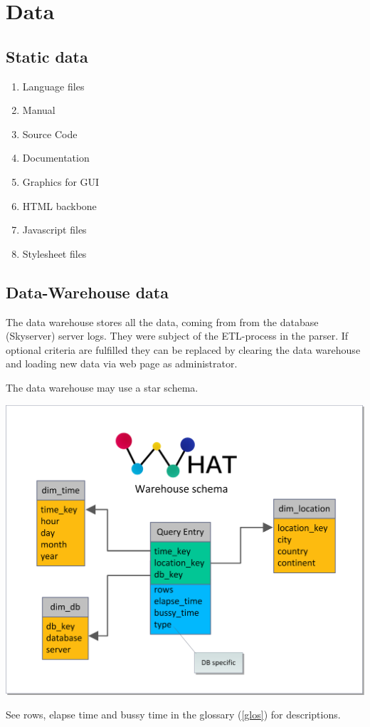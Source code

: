 \section{Data}
\renewcommand{\theenumi}{/D\arabic{enumi}0/}
\renewcommand{\labelenumi}{\theenumi}

\subsection{Static data}

\begin{enumerate}[resume]
  \item Language files
  \item Manual
  \item Source Code
  \item Documentation
  \item Graphics for GUI
  \item HTML backbone
  \item Javascript files
  \item Stylesheet files
\end{enumerate}



\newpage
\subsection{Data-Warehouse data} \label{WHschema}


The data warehouse stores all the data, coming from from the database (Skyserver) server logs.
They were subject of the ETL-process in the parser. If optional criteria are fulfilled
 they can be replaced by clearing the data warehouse 
 and loading new data via web page as administrator.

The data warehouse may use a star schema.
\begin{center}
\includegraphics[width=1\linewidth]{Pictures/WareHouseSchema.png}
\end{center}   
See rows, elapse time and bussy time in the glossary (\ref{glos}) for descriptions. 


